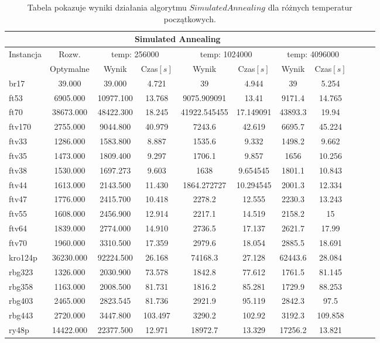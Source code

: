 \begin{center}
\begin{table}
\begin{tabular}{lcccccccccc}
\toprule
\multicolumn{8}{c}{Simulated Annealing} \\
\midrule
\multirow{2}{*}{Instancja} & {Rozw.} &
\multicolumn{2}{c}{temp: 256000} & \multicolumn{2}{c}{temp: 1024000} & 
\multicolumn{2}{c}{temp: 4096000}
 \\
 & Optymalne & Wynik & Czas$[s]$ & Wynik & Czas$[s]$ & Wynik & Czas$[s]$ 
  \\
\toprule
br17 & 39.000 & 39.000 & 4.721 & 39 & 4.944 & 39 & 5.254 \\
\midrule
ft53 & 6905.000 & 10977.100 & 13.768 & 9075.909091 & 13.41 & 9171.4 & 14.765 \\
\midrule
ft70 & 38673.000 & 48422.300 & 18.245 & 41922.545455 & 17.149091 & 43893.3 & 19.94 \\
\midrule
ftv170 & 2755.000 & 9044.800 & 40.979 & 7243.6 & 42.619 & 6695.7 & 45.224 \\
\midrule
ftv33 & 1286.000 & 1583.800 & 8.887 & 1535.6 & 9.332 & 1498.2 & 9.662 \\
\midrule
ftv35 & 1473.000 & 1809.400 & 9.297 & 1706.1 & 9.857 & 1656 & 10.256 \\
\midrule
ftv38 & 1530.000 & 1697.273 & 9.603 & 1638 & 9.654545 & 1801.1 & 10.843 \\
\midrule
ftv44 & 1613.000 & 2143.500 & 11.430 & 1864.272727 & 10.294545 & 2001.3 & 12.334 \\
\midrule
ftv47 & 1776.000 & 2415.700 & 10.418 & 2278.2 & 12.555 & 2230.3 & 13.243 \\
\midrule
ftv55 & 1608.000 & 2456.900 & 12.914 & 2217.1 & 14.519 & 2158.2 & 15 \\
\midrule
ftv64 & 1839.000 & 2774.000 & 14.910 & 2736.5 & 17.137 & 2621.7 & 17.99 \\
\midrule
ftv70 & 1960.000 & 3310.500 & 17.359 & 2979.6 & 18.054 & 2885.5 & 18.691 \\
\midrule
kro124p & 36230.000 & 92224.500 & 26.168 & 74168.3 & 27.128 & 62443.6 & 28.084 \\
\midrule
rbg323 & 1326.000 & 2030.900 & 73.578 & 1842.8 & 77.612 & 1761.5 & 81.145 \\
\midrule
rbg358 & 1163.000 & 2008.500 & 81.731 & 1816.2 & 85.281 & 1729.9 & 88.253 \\
\midrule
rbg403 & 2465.000 & 2823.545 & 81.736 & 2921.9 & 95.119 & 2842.3 & 97.5 \\
\midrule
rbg443 & 2720.000 & 3447.800 & 103.497 & 3290.2 & 102.92 & 3192.3 & 109.858 \\
\midrule
ry48p & 14422.000 & 22377.500 & 12.971 & 18972.7 & 13.329 & 17256.2 & 13.821 \\
\bottomrule
\end{tabular}
\label{sa_diferent_temp}
\caption{Tabela pokazuje wyniki działania algorytmu $Simulated Annealing$
dla różnych temperatur początkowych.}
\end{table}
\end{center}


